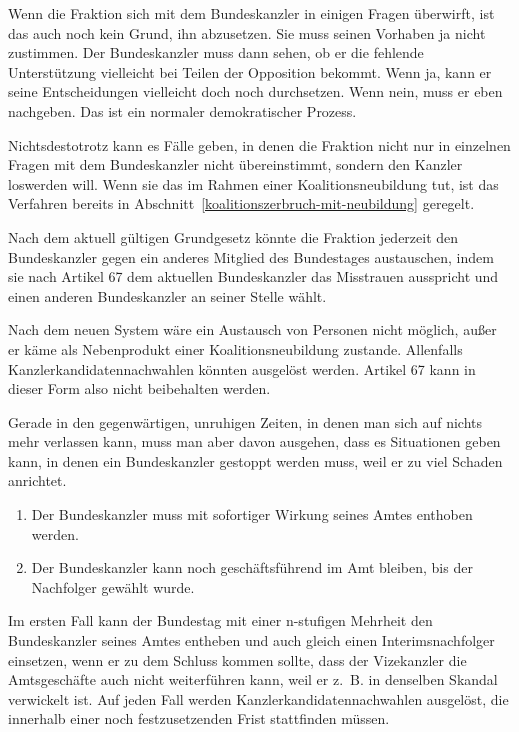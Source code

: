 Wenn die Fraktion sich mit dem Bundeskanzler in einigen Fragen überwirft, ist das auch noch kein Grund, ihn abzusetzen.
Sie muss seinen Vorhaben ja nicht zustimmen.
Der Bundeskanzler muss dann sehen, ob er die fehlende Unterstützung vielleicht bei Teilen der Opposition bekommt.
Wenn ja, kann er seine Entscheidungen vielleicht doch noch durchsetzen.
Wenn nein, muss er eben nachgeben.
Das ist ein normaler demokratischer Prozess.

Nichtsdestotrotz kann es Fälle geben, in denen die Fraktion nicht nur in einzelnen Fragen mit dem Bundeskanzler nicht übereinstimmt, sondern den Kanzler loswerden will.
Wenn sie das im Rahmen einer Koalitionsneubildung tut, ist das Verfahren bereits in Abschnitt~\ref{koalitionszerbruch-mit-neubildung} geregelt.

Nach dem aktuell gültigen Grundgesetz könnte die Fraktion jederzeit den Bundeskanzler gegen ein anderes Mitglied des Bundestages austauschen, indem sie nach Artikel 67 dem aktuellen Bundeskanzler das Misstrauen ausspricht und einen anderen Bundeskanzler an seiner Stelle wählt.

Nach dem neuen System wäre ein Austausch von Personen nicht möglich, außer er käme als Nebenprodukt einer Koalitionsneubildung zustande.
Allenfalls Kanzlerkandidatennachwahlen könnten ausgelöst werden.
Artikel 67 kann in dieser Form also nicht beibehalten werden.

Gerade in den gegenwärtigen, unruhigen Zeiten, in denen man sich auf nichts mehr verlassen kann, muss man aber davon ausgehen, dass es Situationen geben kann, in denen ein Bundeskanzler gestoppt werden muss, weil er zu viel Schaden anrichtet.

\begin{enumerate}
    \item Der Bundeskanzler muss mit sofortiger Wirkung seines Amtes enthoben werden.
    \item Der Bundeskanzler kann noch geschäftsführend im Amt bleiben, bis der Nachfolger gewählt wurde.
\end{enumerate}

Im ersten Fall kann der Bundestag mit einer n-stufigen Mehrheit den Bundeskanzler seines Amtes entheben und auch gleich einen Interimsnachfolger einsetzen, wenn er zu dem Schluss kommen sollte, dass der Vizekanzler die Amtsgeschäfte auch nicht weiterführen kann, weil er z.~B. in denselben Skandal verwickelt ist.
Auf jeden Fall werden Kanzlerkandidatennachwahlen ausgelöst, die innerhalb einer noch festzusetzenden Frist stattfinden müssen.

